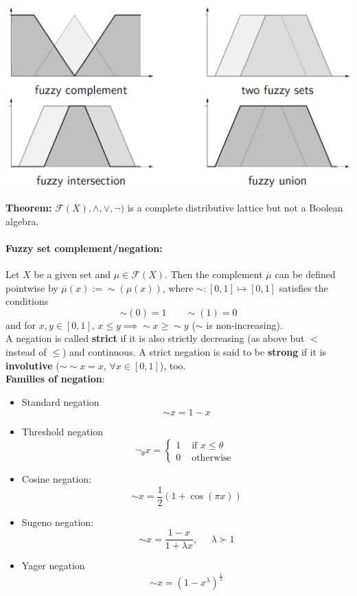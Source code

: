 \documentclass[11pt]{article}
\begin{document}
		\begin{center}
			\includegraphics[width=0.8\columnwidth]{img/FS/fop1}
		\end{center}
		
		\textbf{Theorem:} $\mathcal{F} (X), \wedge, \vee, \neg)$ is a complete distributive lattice but not a Boolean algebra.
		
		\newpage
		
		\paragraph{Fuzzy set complement/negation:} Let $X$ be a given set and $\mu \in \mathcal{F} (X)$. Then the complement $\overline{\mu}$ can be defined pointwise by $\overline{\mu} (x) := \sim (\mu (x))$, where $\sim: [0, 1] \mapsto [0,1]$ satisfies the conditions
		$$ \sim (0) = 1 \;\;\;\;\;\;\; \sim (1) = 0 $$
		and for $x,y \in [0,1]$, $x \leq y \implies \sim x \geq \sim y$ ($\sim$ is non-increasing).\\
		
		A negation is called \textbf{strict} if it is also strictly decreasing (as above but $<$ instead of $\leq$) and continuous. A strict negation is said to be \textbf{strong} if it is \textbf{involutive} ($\sim \sim x = x$, $\forall x \in [0,1]$), too.\\
		
		\textbf{Families of negation}: 
		\begin{itemize}
			\item Standard negation
			$$ \sim x = 1 - x $$
			\item Threshold negation
			$$ \neg_\theta x = \begin{cases}
				1 & \text{ if } x \leq \theta \\
				0 & \text{ otherwise }
			\end{cases}$$
			\item Cosine negation: 
			$$ \sim x = \frac{1}{2} (1 + \cos (\pi x)) $$
			\item Sugeno negation: 
			$$ \sim x = \frac{1 - x}{1 + \lambda x}, \;\;\;\;\; \lambda \succ 1$$
			\item Yager negation
			$$ \sim x = (1 - x^\lambda)^{\frac{1}{\lambda}} $$
		\end{itemize}
		
\end{document}
